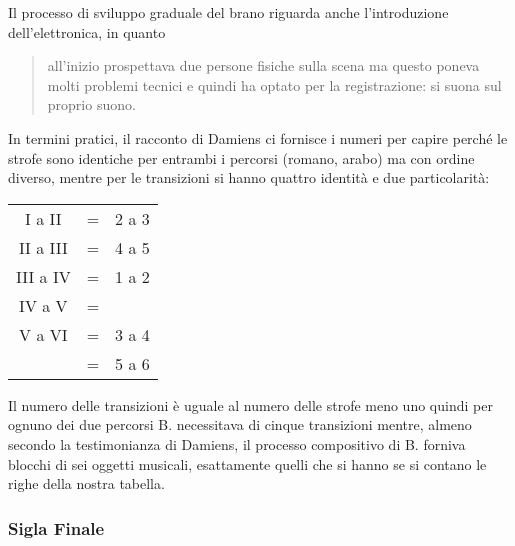 Il processo di sviluppo graduale del brano riguarda anche l'introduzione dell'elettronica, in quanto
\begin{quote}
{\small
all'inizio prospettava due persone fisiche sulla scena ma questo poneva molti problemi tecnici e quindi ha optato per la registrazione: si suona sul proprio suono.
}
\end{quote}

In termini pratici, il racconto di Damiens ci fornisce i numeri per capire perché le strofe sono identiche per entrambi i percorsi (romano, arabo) ma con ordine diverso, mentre per le transizioni si hanno quattro identità e due particolarità:

\begin{minipage}[t]{0.89\columnwidth}%

\begin{table}[H]
\begin{tabular}{c c c}

I a II 		& = & 2 a 3 \\
II a III	& = & 4 a 5 \\
III a IV	& = & 1 a 2 \\
IV a V		& = &  \\
V a VI		& = & 3 a 4\\
			& = & 5 a 6 \\

\end{tabular}
\end{table}%

\end{minipage}%
\bigskip

Il numero delle transizioni è uguale al numero delle strofe meno uno quindi per ognuno dei due percorsi B. necessitava di cinque transizioni mentre, almeno secondo la testimonianza di Damiens, il processo compositivo di B. forniva blocchi di sei oggetti musicali, esattamente quelli che si hanno se si contano le righe della nostra tabella.

\subsubsection*{Sigla Finale}

